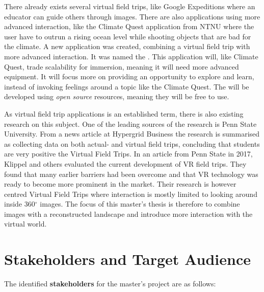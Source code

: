     There already exists several virtual field trips, like Google Expeditions\cite{google_expeditions} where an educator can guide others through images. There are also applications using more advanced interaction, like the Climate Quest\cite{bachelor} application from NTNU where the user have to outrun a rising ocean level while shooting objects that are bad for the climate.
    A new application was created, combining a virtual field trip with more advanced interaction. It was named the \textbf{\ApplicationName}. This application will, like Climate Quest, trade scalability for immersion, meaning it will need more advanced equipment. It will focus more on providing an opportunity to explore and learn, instead of invoking feelings around a topic like the Climate Quest. The \ApplicationName \hspace{0.1cm} will be developed using \emph{open source} resources, meaning they will be free to use.
    
    As virtual field trip applications is an established term, there is also existing research on this subject. One of the leading sources of the research is Penn State University\cite{penn_state}. From a news article at Hypergrid Business\cite{hypergrid} the research is summarised as collecting data on both actual- and virtual field trips, concluding that students are very positive the Virtual Field Trips. In an article from Penn State in 2017, Klippel and others\cite{developing_and_evaluating} evaluated the current development of VR field trips. They found that many earlier barriers had been overcome and that VR technology was ready to become more prominent in the market. Their research is however centred Virtual Field Trips where interaction is mostly limited to looking around inside 360$^{\circ}$ images. The focus of this master's thesis is therefore to combine images with a reconstructed landscape and introduce more interaction with the virtual world.
    
\section{Stakeholders and Target Audience}
    The identified \textbf{stakeholders} for the master's project are as follows:
    
    

